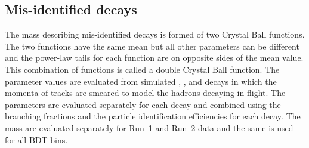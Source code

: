\subsection[Mis-identified \bhh decays]{Mis-identified \boldmath{\bhh} decays}%
The mass \pdf describing mis-identified \bhh decays is formed of two Crystal Ball functions. The two functions have the same mean but all other parameters can be different and the power-law tails for each function are on opposite sides of the mean value. This combination of functions is called a double Crystal Ball function. The parameter values are evaluated from simulated \bdkpi, \bskk, \bdpipi and \bskpi decays in which the momenta of tracks are smeared to model the hadrons decaying in flight. The parameters are evaluated separately for each \bhh decay and combined using the branching fractions and the particle identification efficiencies for each decay. The mass \pdfs are evaluated separately for Run~1 and Run~2 data and the same \pdf is used for all BDT bins.

